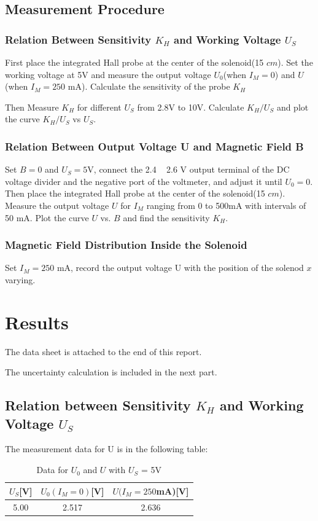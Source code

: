 \documentclass[12pt, a4paper]{article}
\begin{document}
\subsection{Measurement Procedure}
\subsubsection{Relation Between Sensitivity $K_H$ and Working Voltage $U_S$}
First place the integrated Hall probe at the center of the solenoid(15 $cm$). 
Set the working voltage at 5V and measure the output voltage $U_0$(when $I_M = 0$) 
and $U$ (when $I_M = 250$ mA). Calculate the sensitivity of the probe $K_H$

Then Measure $K_H$ for different $U_S$ from 2.8V to 10V. Calculate $K_H/U_S$ and plot the 
curve $K_H/U_S$ vs $U_S$.

\subsubsection{Relation Between Output Voltage U and Magnetic Field B}
Set $B = 0$ and $U_S = 5$V, connect the 2.4 ~ 2.6 V output terminal of the DC voltage
divider and the negative port of the voltmeter, and adjust it until $U_0 = 0$. Then 
place the integrated Hall probe at the center of the solenoid(15 $cm$). Measure the output 
voltage $U$ for $I_M$ ranging from 0 to 500mA with intervals of 50 mA. Plot the curve $U$ vs. 
$B$ and find the sensitivity $K_H$.

\subsubsection{Magnetic Field Distribution Inside the Solenoid}
Set $I_M = 250$ mA, record the output voltage U with the position of the solenod $x$ varying. 


\section{Results}
The data sheet is attached to the end of this report.

The uncertainty calculation is included in the next part.
\subsection{Relation between Sensitivity $K_H$ and Working Voltage $U_S$}
The measurement data for U is in the following table:

\begin{table}[!h]
	\begin{center}
		\begin{tabular}{|c|c|c|}
			\hline
			$U_S$[V] & $U_0(I_M = 0)$[V]& $U(I_M = 250$mA)[V] \\ \hline
			5.00 & 2.517 & 2.636 \\ \hline
		\end{tabular}
		\caption{Data for $U_0$ and $U$ with $U_S$ = 5V}
	\end{center}
\end{table}
\end{document}
